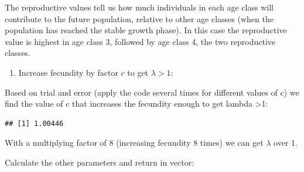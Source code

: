 \documentclass[
]{book}
\newenvironment{Shaded}{\begin{snugshade}}{\end{snugshade}}
\newcommand{\AttributeTok}[1]{\textcolor[rgb]{0.77,0.63,0.00}{#1}}
\newcommand{\CommentTok}[1]{\textcolor[rgb]{0.56,0.35,0.01}{\textit{#1}}}
\newcommand{\DecValTok}[1]{\textcolor[rgb]{0.00,0.00,0.81}{#1}}
\newcommand{\FunctionTok}[1]{\textcolor[rgb]{0.00,0.00,0.00}{#1}}
\newcommand{\NormalTok}[1]{#1}
\newcommand{\OtherTok}[1]{\textcolor[rgb]{0.56,0.35,0.01}{#1}}
\newcommand{\SpecialCharTok}[1]{\textcolor[rgb]{0.00,0.00,0.00}{#1}}
\providecommand{\tightlist}{%
  \setlength{\itemsep}{0pt}\setlength{\parskip}{0pt}}
\begin{document}
The reproductive values tell us how much individuals in each age class will contribute to the future population, relative to other age classes (when the population has reached the stable growth phase). In this case the reproductive value is highest in age class 3, followed by age class 4, the two reproductive classes.

\begin{enumerate}
\def\labelenumi{\arabic{enumi}.}
\setcounter{enumi}{6}
\tightlist
\item
  Increase fecundity by factor \(c\) to get \(\lambda>1\):
\end{enumerate}

Based on trial and error (apply the code several times for different values of c) we find the value of c that increases the fecundity enough to get lambda \textgreater1:

\begin{Shaded}
\end{Shaded}

\begin{verbatim}
## [1] 1.00446
\end{verbatim}

With a multiplying factor of 8 (increasing fecundity 8 times) we can get \(\lambda\) over 1.

Calculate the other parameters and return in vector:
\end{document}
